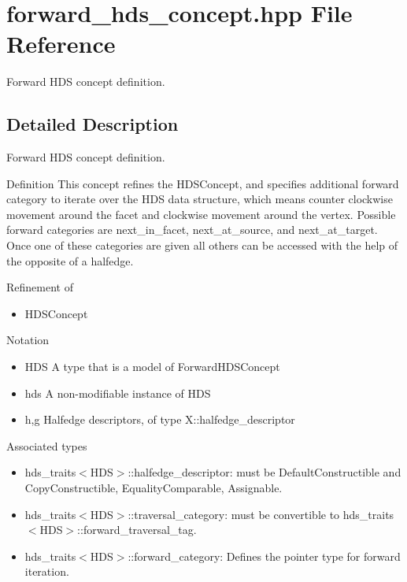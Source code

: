\section{forward\_\-hds\_\-concept.hpp File Reference}
\label{forward__hds__concept_8hpp}
Forward HDS concept definition. 



\subsection{Detailed Description}
Forward HDS concept definition. 

\begin{Desc}
\item[Definition]This concept refines the HDSConcept, and specifies additional forward category to iterate over the HDS data structure, which means counter clockwise movement around the facet and clockwise movement around the vertex. Possible forward categories are next\_\-in\_\-facet, next\_\-at\_\-source, and next\_\-at\_\-target. Once one of these categories are given all others can be accessed with the help of the opposite of a halfedge.\end{Desc}
\begin{Desc}
\item[Refinement of]\begin{itemize}
\item HDSConcept\end{itemize}
\end{Desc}
\begin{Desc}
\item[Notation]\begin{itemize}
\item HDS A type that is a model of Forward\-HDSConcept\item hds A non-modifiable instance of HDS\item h,g Halfedge descriptors, of type X::halfedge\_\-descriptor\end{itemize}
\end{Desc}
\begin{Desc}
\item[Associated types]\begin{itemize}
\item hds\_\-traits$<$HDS$>$::halfedge\_\-descriptor: must be Default\-Constructible and Copy\-Constructible, Equality\-Comparable, Assignable.\item hds\_\-traits$<$HDS$>$::traversal\_\-category: must be convertible to hds\_\-traits$<$HDS$>$::forward\_\-traversal\_\-tag.\item hds\_\-traits$<$HDS$>$::forward\_\-category: Defines the pointer type for forward iteration.\end{itemize}
\end{Desc}
